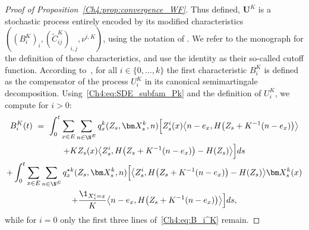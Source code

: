 \begin{refsegment}
\begin{proof}[Proof of Proposition~\ref{Ch4:prop:convergence_WF}]
Thus defined, $\bm U^K$ is a stochastic process entirely encoded by its modified characteristics $((B_i^K)_i, (\tilde C_{ij}^K)_{i,j}, \nu^{i,K})$, using the notation of 
\citet[Chapter~2]{jacod-shiryaev}. We refer to the monograph for the definition of these characteristics, and use the identity as their so-called cutoff function.  According to~\citet[Chapter~2, Definition~2.6]{jacod-shiryaev}, for all $i\in\{0,\ldots, k\}$ the first characteristic $B_i^K$ is defined as the compensator of the process $U^{K}_i$ in its canonical semimartingale decomposition. Using~\eqref{Ch4:eq:SDE_subfam_Pk} and the definition of $U^K_i$, we compute for $i>0$:
\begin{multline}\label{Ch4:eq:B_i^K}
B_i^K(t) \ =\ \int_{0}^t  \sum_{x\in E}\sum_{n\in\N^E} q^k_x(Z_s, \bm X^k_s, n)  \Big[ Z^i_s(x) \big\langle n -e_x, H\big(Z_s+ K^{-1}(n -e_x)\big) \big\rangle  \\
  + K Z_s(x)
  \big\langle Z^i_s , H\big(Z_s+ K^{-1}(n -e_x)\big) -  H(Z_s) \big\rangle\Big]ds\\
  + \int_{0}^t  \sum_{x\in E}\sum_{n\in\N^E}  q^{\star k}_x(Z_s,\bm X^k_s, n ) \Big[\big\langle Z^i_s, H\big(Z_s+ K^{-1}(n-e_x)\big)- H(Z_s) \big\rangle \bm X^k_s(x)\\
  +\frac{\1_{X^{i}_s=x}}{K}\big\langle n -e_x, H\big(Z_s+ K^{-1}(n -e_x)\big) \big\rangle\Big]ds,
\end{multline}
while for $i=0$ only the first three lines of~\eqref{Ch4:eq:B_i^K} remain.



\end{proof}
\end{refsegment}
